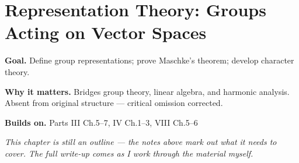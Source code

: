 \chapter{Representation Theory: Groups Acting on Vector Spaces}
\label{ch:13-category-theory-and-universal-structures-07}

\begin{chapterintro}
\textbf{Goal.} Define group representations; prove Maschke's theorem; develop character theory.

\textbf{Why it matters.} Bridges group theory, linear algebra, and harmonic analysis. Absent from original structure — critical omission corrected.

\textbf{Builds on.} Parts III Ch.5–7, IV Ch.1–3, VIII Ch.5–6
\end{chapterintro}

\textit{This chapter is still an outline --- the notes above mark out what it needs to cover. The full write-up comes as I work through the material myself.}
